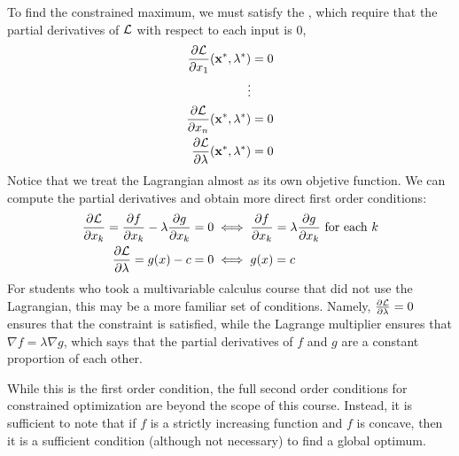 To find the constrained maximum, we must satisfy the , which require that the partial derivatives of $\mathcal{L}$ with respect to each input is 0,
\begin{align*}
    \frac{\partial \mathcal{L}}{\partial x_1}(\mathbf{x}^*, \lambda^*) &= 0 \\
    \vdots \\
    \frac{\partial \mathcal{L}}{\partial x_n}(\mathbf{x}^*, \lambda^*) &= 0 \\
    \frac{\partial \mathcal{L}}{\partial \lambda}(\mathbf{x}^*, \lambda^*) &= 0
\end{align*}
Notice that we treat the Lagrangian almost as its own objetive function. We can compute the partial derivatives and obtain more direct first order conditions:
\begin{align*}
    \frac{\partial \mathcal{L}}{\partial x_k} = \frac{\partial f}{\partial x_k} - \lambda \frac{\partial g}{\partial x_k} = 0 &\iff \frac{\partial f}{\partial x_k} = \lambda \frac{\partial g}{\partial x_k} \text{ for each $k$}\\
    \frac{\partial \mathcal{L}}{\partial \lambda} = g(x) - c = 0 &\iff g(x) = c
\end{align*}
For students who took a multivariable calculus course that did not use the Lagrangian, this may be a more familiar set of conditions. Namely, $\frac{\partial \mathcal{L}}{\partial \lambda} = 0$ ensures that the constraint is satisfied, while the Lagrange multiplier ensures that $\nabla f = \lambda \nabla g$, which says that the partial derivatives of $f$ and $g$ are a constant proportion of each other.

While this is the first order condition, the full second order conditions for constrained optimization are beyond the scope of this course. Instead, it is sufficient to note that if $f$ is a strictly increasing function and $f$ is concave, then it is a sufficient condition (although not necessary) to find a global optimum. 



